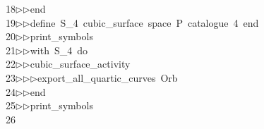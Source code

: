 \begin{tabbing}
18\>$\triangleright$\>$\triangleright$\>end\ \\[0pt]
19\>$\triangleright$\>$\triangleright$\>define\ S\_4\ cubic\_surface\ space\ P\ catalogue\ 4\ end\ \\[0pt]
20\>$\triangleright$\>$\triangleright$\>print\_symbols\ \\[0pt]
21\>$\triangleright$\>$\triangleright$\>with\ S\_4\ do\ \\[0pt]
22\>$\triangleright$\>$\triangleright$\>cubic\_surface\_activity\ \\[0pt]
23\>$\triangleright$\>$\triangleright$\>$\triangleright$\>export\_all\_quartic\_curves\ Orb\ \\[0pt]
24\>$\triangleright$\>$\triangleright$\>end\ \\[0pt]
25\>$\triangleright$\>$\triangleright$\>print\_symbols\\[0pt]
26\>\end{tabbing}

